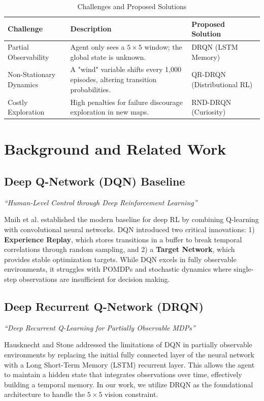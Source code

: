 \documentclass{article}
\begin{document}
\begin{table}[H]
    \centering
    \caption{Challenges and Proposed Solutions}
    \label{tab:challenges}
    \begin{tabularx}{\textwidth}{l X l}
        \toprule
        \textbf{Challenge} & \textbf{Description} & \textbf{Proposed Solution} \\
        \midrule
        Partial Observability & Agent only sees a $5\times5$ window; the global state is unknown. & DRQN (LSTM Memory) \\
        Non-Stationary Dynamics & A "wind" variable shifts every 1,000 episodes, altering transition probabilities. & QR-DRQN (Distributional RL) \\
        Costly Exploration & High penalties for failure discourage exploration in new maps. & RND-DRQN (Curiosity) \\
        \bottomrule
    \end{tabularx}
\end{table}

\section{Background and Related Work}

\subsection{Deep Q-Network (DQN) Baseline}
\textit{``Human-Level Control through Deep Reinforcement Learning''} \cite{mnih2015human}

Mnih et al. established the modern baseline for deep RL by combining Q-learning with convolutional neural networks. DQN introduced two critical innovations: 1) \textbf{Experience Replay}, which stores transitions in a buffer to break temporal correlations through random sampling, and 2) a \textbf{Target Network}, which provides stable optimization targets. While DQN excels in fully observable environments, it struggles with POMDPs and stochastic dynamics where single-step observations are insufficient for decision making.

\subsection{Deep Recurrent Q-Network (DRQN)}
\textit{``Deep Recurrent Q-Learning for Partially Observable MDPs''} \cite{hausknecht2017}

Hausknecht and Stone addressed the limitations of DQN in partially observable environments by replacing the initial fully connected layer of the neural network with a Long Short-Term Memory (LSTM) recurrent layer. This allows the agent to maintain a hidden state that integrates observations over time, effectively building a temporal memory. In our work, we utilize DRQN as the foundational architecture to handle the $5\times5$ vision constraint.
\end{document}
